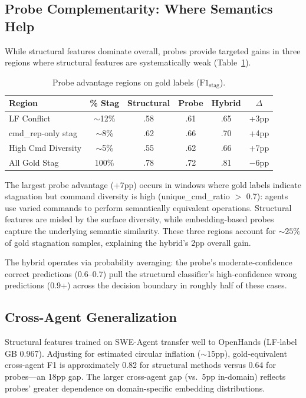 \documentclass[11pt]{article}
\begin{document}
\subsection{Probe Complementarity: Where Semantics Help}
\label{sec:hybrid}

While structural features dominate overall, probes provide targeted gains in three regions where structural features are systematically weak (Table~\ref{tab:probe_regions}).

\begin{table}[t]
\centering
\caption{Probe advantage regions on gold labels ($\text{F1}_\text{stag}$).}
\label{tab:probe_regions}
\small
\begin{tabular}{lccccc}
\toprule
\textbf{Region} & \textbf{\% Stag} & \textbf{Structural} & \textbf{Probe} & \textbf{Hybrid} & $\Delta$ \\
\midrule
LF Conflict           & $\sim$12\% & .58 & .61 & .65 & +3pp \\
cmd\_rep-only stag    & $\sim$8\%  & .62 & .66 & .70 & +4pp \\
High Cmd Diversity     & $\sim$5\%  & .55 & .62 & .66 & +7pp \\
\midrule
All Gold Stag          & 100\%      & .78 & .72 & .81 & $-$6pp \\
\bottomrule
\end{tabular}
\end{table}

The largest probe advantage (+7pp) occurs in windows where gold labels indicate stagnation but command diversity is high (unique\_cmd\_ratio $>$ 0.7): agents use varied commands to perform semantically equivalent operations.
Structural features are misled by the surface diversity, while embedding-based probes capture the underlying semantic similarity.
These three regions account for ${\sim}25\%$ of gold stagnation samples, explaining the hybrid's 2pp overall gain.

The hybrid operates via probability averaging: the probe's moderate-confidence correct predictions (0.6--0.7) pull the structural classifier's high-confidence wrong predictions (0.9+) across the decision boundary in roughly half of these cases.

\subsection{Cross-Agent Generalization}
\label{sec:cross_agent}

Structural features trained on SWE-Agent transfer well to OpenHands (LF-label GB 0.967).
Adjusting for estimated circular inflation (${\sim}15$pp), gold-equivalent cross-agent F1 is approximately 0.82 for structural methods versus 0.64 for probes---an 18pp gap.
The larger cross-agent gap (vs.\ 5pp in-domain) reflects probes' greater dependence on domain-specific embedding distributions.
\end{document}
